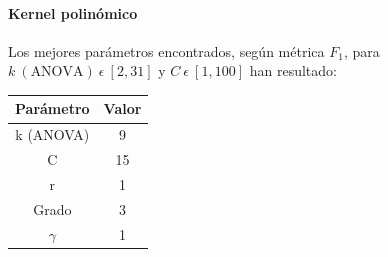 \paragraph{Kernel polinómico}

Los mejores parámetros encontrados, según métrica $F_{1}$, para $k\:(\mbox{ANOVA})\:\epsilon\:[2,31]$ y $C\:\epsilon\:[1,100]$ han resultado:

\begin{table}[H]
	\begin{tabular}{|c|c|}
		\hline
		Parámetro & Valor \\ \hline
		k (ANOVA) & 9 \\ \hline
		C & 15\\ \hline
		r & 1 \\ \hline
		Grado & 3 \\ \hline
		$\gamma$ & 1 \\ \hline
	\end{tabular}
\end{table}

